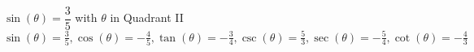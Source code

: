 {$\sin(\theta) = \dfrac{3}{5}$ with $\theta$ in Quadrant II}
{$\sin(\theta) = \frac{3}{5}, \cos(\theta) = -\frac{4}{5}, \tan(\theta) = -\frac{3}{4}, \csc(\theta) = \frac{5}{3}, \sec(\theta) = -\frac{5}{4}, \cot(\theta) = -\frac{4}{3}$}